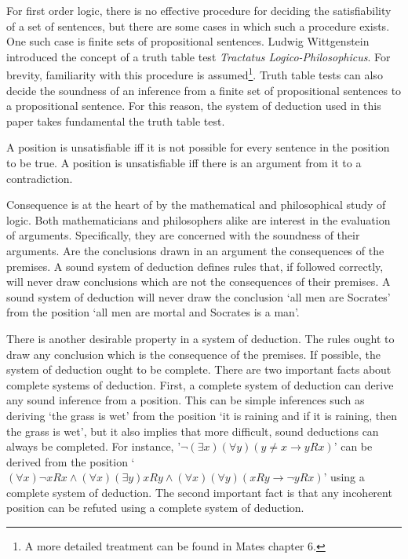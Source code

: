 \documentclass[12pt]{article}
\theoremstyle{definition}
\theoremstyle{remark}
\begin{document}
For first order logic, there is no effective procedure for deciding the satisfiability of a set of sentences, but there are some cases in which such a procedure exists. One such case is finite sets of propositional sentences. Ludwig Wittgenstein introduced the concept of a truth table test \textit{Tractatus Logico-Philosophicus}\cite{tractatus}. For brevity, familiarity with this procedure is assumed\footnote{A more detailed treatment can be found in Mates\cite{mates} chapter 6.}. Truth table tests can also decide the soundness of an inference from a finite set of propositional sentences to a propositional sentence. For this reason, the system of deduction used in this paper takes fundamental the truth table test. 

A position is unsatisfiable iff it is not possible for every sentence in the position to be true. A position is unsatisfiable iff there is an argument from it to a contradiction.

Consequence is at the heart of by the mathematical and philosophical study of logic. Both mathematicians and philosophers alike are interest in the evaluation of arguments. Specifically, they are concerned with the soundness of their arguments. Are the conclusions drawn in an argument the consequences of the premises. A sound system of deduction defines rules that, if followed correctly, will never draw conclusions which are not the consequences of their premises. A sound system of deduction will never draw the conclusion `all men are Socrates' from the position `all men are mortal and Socrates is a man'.

There is another desirable property in a system of deduction. The rules ought to draw any conclusion which is the consequence of the premises. If possible, the system of deduction ought to be complete. There are two important facts about complete systems of deduction. First, a complete system of deduction can derive any sound inference from a position. This can be simple inferences such as deriving `the grass is wet' from the position `it is raining and if it is raining, then the grass is wet', but it also implies that more difficult, sound deductions can always be completed. For instance, '$\neg(\exists x)(\forall y)(y \neq x \rightarrow yRx)$' can be derived from the position `$(\forall x)\neg xRx \land (\forall x)(\exists y)xRy \land (\forall x)(\forall y)(xRy \rightarrow \neg yRx)$' using a complete system of deduction. The second important fact is that any incoherent position can be refuted using a complete system of deduction. 
\end{document}
